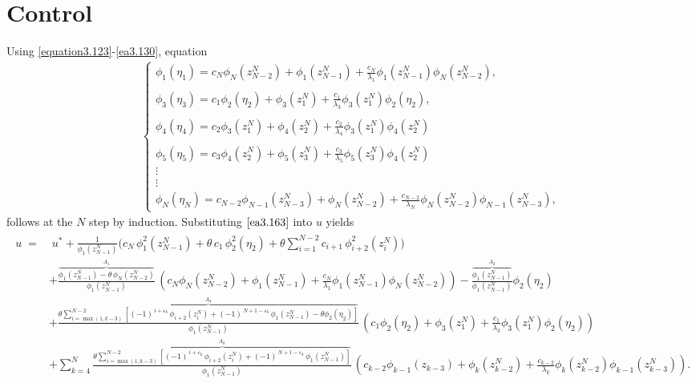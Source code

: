 \documentclass[10pt, a4paper]{amsart}
\theoremstyle{plain}
\theoremstyle{definition}
\theoremstyle{remark}
\numberwithin{equation}{section}
\begin{document}
\section*{Control}
Using \eqref{equation3.123}-\eqref{ea3.130}, equation
\begin{align}\label{ea3.163}
\begin{cases}
\phi_1(\eta_1)=c_N\phi_N(z^N_{N-2})+\phi_1(z^N_{N-1})+\frac{c_N}{\lambda_1}\phi_1(z^N_{N-1})\phi_N(z^N_{N-2}),\\
\\\phi_3(\eta_3)=c_1\phi_2(\eta_2)+\phi_3(z^N_1)+\frac{c_1}{\lambda_3}\phi_3(z^N_1)\phi_2(\eta_2),\\
\\\phi_4(\eta_4)=c_2\phi_3(z^N_1)+\phi_4(z^N_2)+\frac{c_2}{\lambda_4}\phi_3(z^N_1)\phi_4(z^N_2)\\
\\\phi_5(\eta_5)=c_3\phi_4(z^N_2)+\phi_5(z^N_3)+\frac{c_3}{\lambda_5}\phi_5(z^N_3)\phi_4(z^N_2)\\
\vdots\\
\vdots
\\\phi_N(\eta_N)=c_{N-2}\phi_{N-1}(z^N_{N-3})+\phi_N(z^N_{N-2})+\frac{c_{N-2}}{\lambda_N}\phi_N(z^N_{N-2})\phi_{N-1}(z^N_{N-3}),%
\end{cases}
\end{align}
follows at the $N$ step by induction. Substituting $\eqref{ea3.163}$ into $u$ yields 
\begin{align}%
\begin{aligned}
u \;=&\; u^*
+\frac{1}{\phi_1(z^N_{N-1})}\Bigg(
c_{N}\,\phi_1^2(z^N_{N-1})
+\theta\,c_1\,\phi_2^2(\eta_2)
+\theta \sum_{i=1}^{N-2} c_{i+1}\,\phi_{i+2}^2(z^N_i)\Bigg) \\
&+\frac{\overbrace{\phi_1(z^N_{N-1})-\theta\,\phi_{N}(z^N_{N-2})}^{A_1}}{\phi_1(z^N_{N-1})}\,(c_N\phi_N(z^N_{N-2})+\phi_1(z^N_{N-1})+\frac{c_N}{\lambda_1}\phi_1(z^N_{N-1})\phi_N(z^N_{N-2}))
-\frac{\overbrace{\phi_1(z^N_{N-1})}^{A_2}}{\phi_1(z^N_{N-1})}\phi_2(\eta_2) \\
&+
\frac{\overbrace{\displaystyle
\theta \sum_{i=\max(1,k-3)}^{N-2} [(-1)^{\,i+\varepsilon_k}\,\phi_{i+2}(z^N_i)
+(-1)^{\,N+1-\varepsilon_k}\,\phi_1(z^N_{N-1})-\theta\phi_2(\eta_2)]}^{A_3}
}{\phi_1(z^N_{N-1})}\,(c_1\phi_2(\eta_2)+\phi_3(z^N_1)+\frac{c_1}{\lambda_3}\phi_3(z^N_1)\phi_2(\eta_2))\\
&+\sum_{k=4}^{N}
\frac{\overbrace{\displaystyle
\theta \sum_{i=\max(1,k-3)}^{N-2} [(-1)^{\,i+\varepsilon_k}\,\phi_{i+2}(z^N_i)
+(-1)^{\,N+1-\varepsilon_k}\,\phi_1(z^N_{N-1})]}^{A_k}
}{\phi_1(z^N_{N-1})}\,(c_{k-2}\phi_{k-1}(z_{k-3})+\phi_k(z^N_{k-2})+\frac{c_{k-2}}{\lambda_k}\phi_k(z^N_{k-2})\phi_{k-1}(z^N_{k-3})).
\end{aligned}
\end{align}
\end{document}
